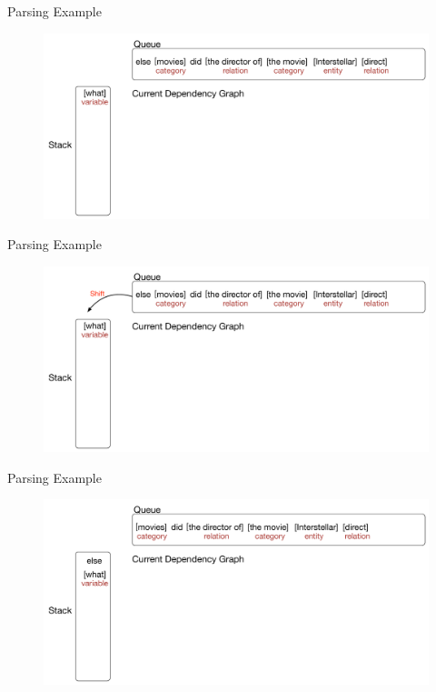 \documentclass{beamer}
\begin{document}
\begin{frame}{Parsing Example}
	\begin{figure}
		\centering\includegraphics[width=1.0\textwidth]{introduction/parsing_examples/2.pdf}
	\end{figure}	
\end{frame}

\begin{frame}{Parsing Example}
	\begin{figure}
		\centering\includegraphics[width=1.0\textwidth]{introduction/parsing_examples/3.pdf}
	\end{figure}	
\end{frame}

\begin{frame}{Parsing Example}
	\begin{figure}
		\centering\includegraphics[width=1.0\textwidth]{introduction/parsing_examples/4.pdf}
	\end{figure}	
\end{frame}
\end{document}
